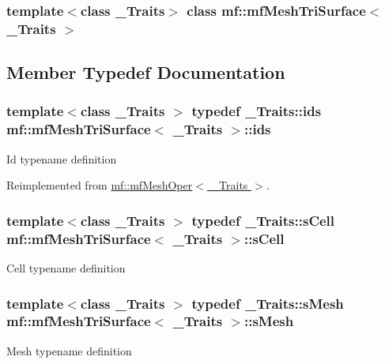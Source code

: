 \subsubsection*{template$<$class \_\-Traits$>$ class mf::mfMeshTriSurface$<$ \_\-Traits $>$}



\subsection{Member Typedef Documentation}
\hypertarget{classmf_1_1mfMeshTriSurface_a2432b4eb1b385605e96d17e2774519f5}{
\subsubsection[{ids}]{\setlength{\rightskip}{0pt plus 5cm}template$<$class \_\-Traits $>$ typedef \_\-Traits::ids {\bf mf::mfMeshTriSurface}$<$ \_\-Traits $>$::{\bf ids}}}
\label{classmf_1_1mfMeshTriSurface_a2432b4eb1b385605e96d17e2774519f5}
Id typename definition 

Reimplemented from \hyperlink{classmf_1_1mfMeshOper_a526d1466339244781fbdc0dbfe5ad210}{mf::mfMeshOper$<$ \_\-Traits $>$}.

\hypertarget{classmf_1_1mfMeshTriSurface_a75283f44a5903a67f6bbb7094b8a900f}{
\subsubsection[{sCell}]{\setlength{\rightskip}{0pt plus 5cm}template$<$class \_\-Traits $>$ typedef \_\-Traits::sCell {\bf mf::mfMeshTriSurface}$<$ \_\-Traits $>$::{\bf sCell}}}
\label{classmf_1_1mfMeshTriSurface_a75283f44a5903a67f6bbb7094b8a900f}
Cell typename definition \hypertarget{classmf_1_1mfMeshTriSurface_aa25d8c016f15b0073c5ba5aa0a64be86}{
\subsubsection[{sMesh}]{\setlength{\rightskip}{0pt plus 5cm}template$<$class \_\-Traits $>$ typedef \_\-Traits::sMesh {\bf mf::mfMeshTriSurface}$<$ \_\-Traits $>$::{\bf sMesh}}}
\label{classmf_1_1mfMeshTriSurface_aa25d8c016f15b0073c5ba5aa0a64be86}
Mesh typename definition 


